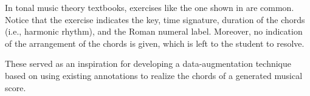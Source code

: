
In tonal music theory textbooks, exercises like the one
shown in  are common. Notice that
the exercise indicates the key, time signature, duration of
the chords (i.e., harmonic rhythm), and the Roman numeral
label. Moreover, no indication of the arrangement of the
chords is given, which is left to the student to resolve.


These served as an inspiration for developing a
data-augmentation technique based on using existing
annotations to \gls{realize} the chords of a generated
musical score.
